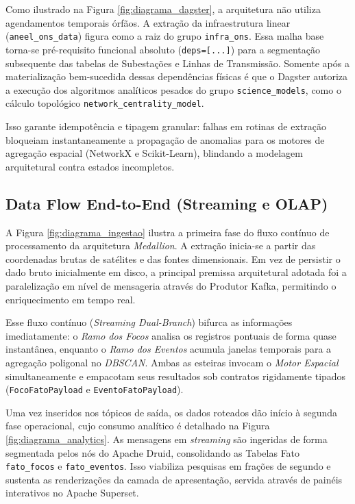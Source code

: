 Como ilustrado na Figura \ref{fig:diagrama_dagster}, a arquitetura não utiliza agendamentos temporais órfãos. A extração da infraestrutura linear (\texttt{aneel\_ons\_data}) figura como a raiz do grupo \texttt{infra\_ons}. Essa malha base torna-se pré-requisito funcional absoluto (\texttt{deps=[...]}) para a segmentação subsequente das tabelas de Subestações e Linhas de Transmissão. Somente após a materialização bem-sucedida dessas dependências físicas é que o Dagster autoriza a execução dos algoritmos analíticos pesados do grupo \texttt{science\_models}, como o cálculo topológico \texttt{network\_centrality\_model}. 

Isso garante idempotência e tipagem granular: falhas em rotinas de extração bloqueiam instantaneamente a propagação de anomalias para os motores de agregação espacial (NetworkX e Scikit-Learn), blindando a modelagem arquitetural contra estados incompletos.





\subsection{Data Flow End-to-End (Streaming e OLAP)}

A Figura \ref{fig:diagrama_ingestao} ilustra a primeira fase do fluxo contínuo de processamento da arquitetura \textit{Medallion}. A extração inicia-se a partir das coordenadas brutas de satélites e das fontes dimensionais. Em vez de persistir o dado bruto inicialmente em disco, a principal premissa arquitetural adotada foi a paralelização em nível de mensageria através do Produtor Kafka, permitindo o enriquecimento em tempo real.

Esse fluxo contínuo (\textit{Streaming Dual-Branch}) bifurca as informações imediatamente: o \textit{Ramo dos Focos} analisa os registros pontuais de forma quase instantânea, enquanto o \textit{Ramo dos Eventos} acumula janelas temporais para a agregação poligonal no \textit{DBSCAN}. Ambas as esteiras invocam o \textit{Motor Espacial} simultaneamente e empacotam seus resultados sob contratos rigidamente tipados (\texttt{FocoFatoPayload} e \texttt{EventoFatoPayload}).



Uma vez inseridos nos tópicos de saída, os dados roteados dão início à segunda fase operacional, cujo consumo analítico é detalhado na Figura \ref{fig:diagrama_analytics}. As mensagens em \textit{streaming} são ingeridas de forma segmentada pelos nós do Apache Druid, consolidando as Tabelas Fato \texttt{fato\_focos} e \texttt{fato\_eventos}. Isso viabiliza pesquisas em frações de segundo e sustenta as renderizações da camada de apresentação, servida através de painéis interativos no Apache Superset.

